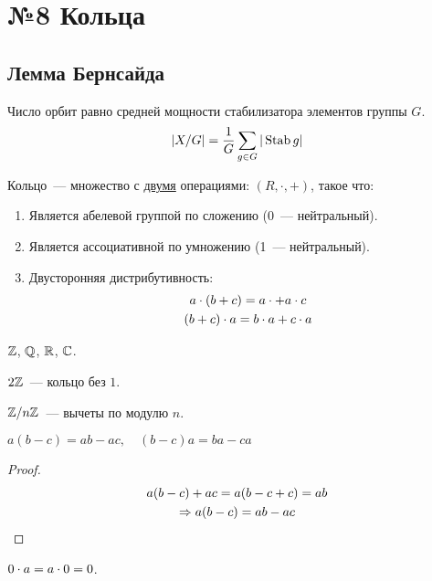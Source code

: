 \section{№8 Кольца}

\subsection{Лемма Бернсайда}

\begin{lemma}
  Число орбит равно средней мощности стабилизатора элементов группы $G$.
  \[|X/G| = \frac{1}{G} \sum_{g \in G} |\operatorname{Stab} g|\]
\end{lemma}

\begin{definition}
  Кольцо~--- множество с \underline{двумя} операциями: $(R, \cdot, +)$, такое что:
  \begin{enumerate}
    \item Является абелевой группой по сложению (0~--- нейтральный).
    \item Является ассоциативной по умножению (1~--- нейтральный).
    \item Двусторонняя дистрибутивность: 
    \begin{gather}
      a \cdot (b + c) = a\cdot + a \cdot c \\
      (b + c) \cdot a = b \cdot a + c \cdot a
    \end{gather}
  \end{enumerate}
\end{definition}

\begin{example}
  $\mathbb{Z}$, $\mathbb{Q}$, $\mathbb{R}$, $\mathbb{C}$.


  $2 \mathbb{Z}$~--- кольцо без $1$.

  $\mathbb{Z} / n \mathbb{Z}$~--- вычеты по модулю $n$.
\end{example}

\begin{proposition}
  $a(b - c) = ab - ac, \quad (b-c)a = ba - ca$
\end{proposition}

\begin{proof}
  \begin{gather}
    a(b - c) + ac = a(b - c + c) = ab \\
    \Rightarrow a(b - c) = ab - ac
  \end{gather}
\end{proof}

\begin{proposition}
  $0 \cdot a = a \cdot 0 = 0$.
\end{proposition}

